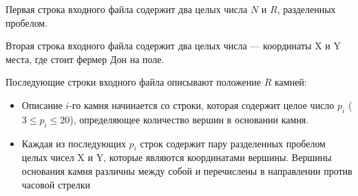 Первая строка входного файла содержит два целых числа $N$ и $R$, разделенных пробелом. 

Вторая строка входного файла содержит два целых числа --- координаты
X и Y места, где стоит фермер Дон на поле. 

Последующие строки входного файла описывают положение $R$ камней: 
\begin{itemize}
\item Описание $i$-го камня начинается со строки, которая содержит целое
число $p_i$ ($3 \le p_i \le 20$), определяющее количество вершин в основании
камня. 
\item Каждая из последующих $p_i$ строк содержит пару разделенных
пробелом целых чисел X и Y, которые являются координатами
вершины. Вершины основания камня различны между собой и
перечислены в направлении против часовой стрелки
\end{itemize}